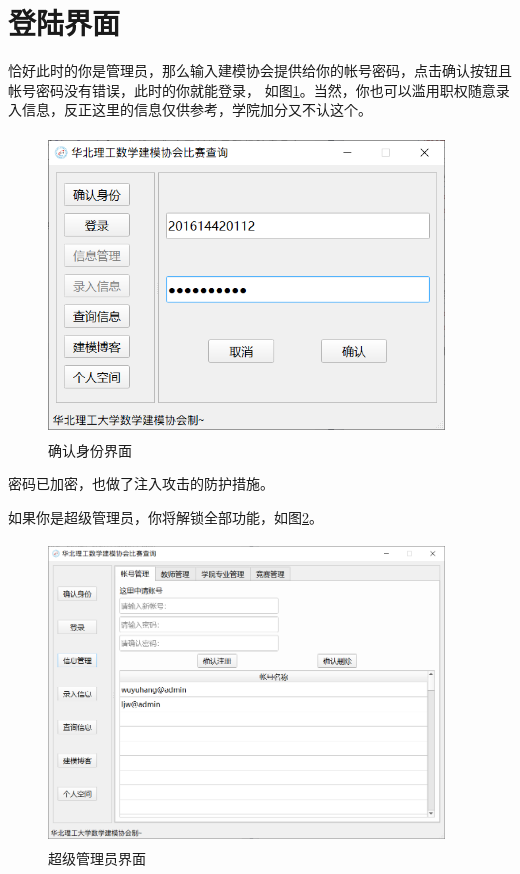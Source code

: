 \documentclass[cn, 11pt, chinese, show]{elegantbook}
\begin{document}
\section{登陆界面}

恰好此时的你是管理员，那么输入建模协会提供给你的帐号密码，点击确认按钮且帐号密码没有错误，此时的你就能登录，
如图\ref{fig:login}。当然，你也可以滥用职权随意录入信息，反正这里的信息仅供参考，学院加分又不认这个。

\begin{figure}[h]
    \centering
    \includegraphics[width=10.5cm, height=8cm]{figure/3.png}
    \caption{确认身份界面}
    \label{fig:login}
\end{figure}

\begin{remark}
密码已加密，也做了注入攻击的防护措施。
\end{remark}

\newpage

如果你是超级管理员，你将解锁全部功能，如图\ref{fig:superadmin}。

\begin{figure}[h]
    \centering
    \includegraphics[width=10.5cm, height=8cm]{figure/4.png}
    \caption{超级管理员界面}
    \label{fig:superadmin}
\end{figure}
\end{document}
